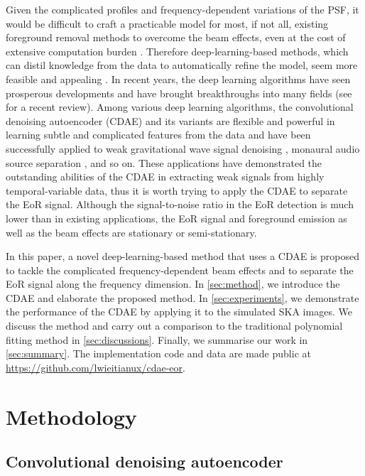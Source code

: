 \documentclass[fleqn,usenatbib]{mnras}
\begin{document}
Given the complicated profiles and frequency-dependent variations of
the PSF, it would be difficult to craft a practicable model for most,
if not all, existing foreground removal methods to overcome the beam
effects, even at the cost of extensive computation burden
\citep[e.g.,][]{lochner2015}.
Therefore deep-learning-based methods, which can distil knowledge from
the data to automatically refine the model, seem more feasible
and appealing \citep[e.g.,][]{herbel2018,vafaeiSadr2018}.
In recent years, the deep learning algorithms have seen prosperous
developments and have brought breakthroughs into many fields
(see \citealt{lecun2015} for a recent review).
Among various deep learning algorithms, the convolutional denoising
autoencoder (CDAE) and its variants are flexible and powerful in
learning subtle and complicated features from the data and have been
successfully applied to
weak gravitational wave signal denoising \citep[e.g.,][]{shen2017},
monaural audio source separation \citep[e.g.,][]{grais2017}, and so on.
These applications have demonstrated the outstanding abilities of the
CDAE in extracting weak signals from highly temporal-variable data,
thus it is worth trying to apply the CDAE to separate the EoR signal.
Although the signal-to-noise ratio in the EoR detection is much lower
than in existing applications, the EoR signal and foreground emission
as well as the beam effects are stationary or semi-stationary.

In this paper, a novel deep-learning-based method that uses a CDAE
is proposed to tackle the complicated frequency-dependent beam effects
and to separate the EoR signal along the frequency dimension.
In \autoref{sec:method}, we introduce the CDAE and elaborate
the proposed method.
In \autoref{sec:experiments}, we demonstrate the performance of the
CDAE by applying it to the simulated SKA images.
We discuss the method and carry out a comparison to the traditional
polynomial fitting method in \autoref{sec:discussions}.
Finally, we summarise our work in \autoref{sec:summary}.
The implementation code and data are made public at
\url{https://github.com/lwieitianux/cdae-eor}.


\section{Methodology}
\label{sec:method}

\subsection{Convolutional denoising autoencoder}
\label{sec:cdae}
\end{document}
